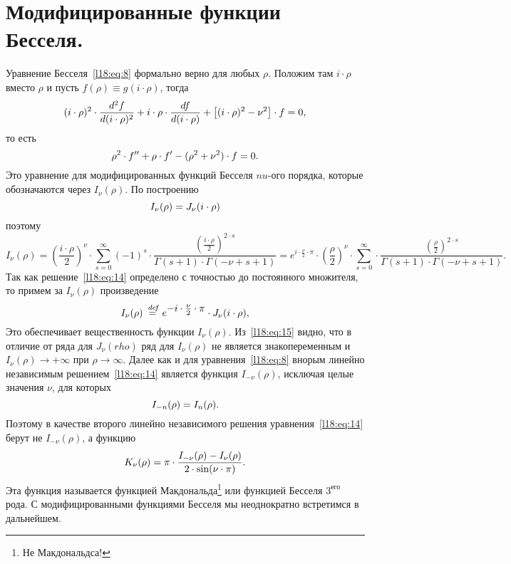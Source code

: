 \section{Модифицированные функции Бесселя.}
\label{lecture18section2}
Уравнение Бесселя~\eqref{l18:eq:8} формально верно для любых $\rho$. Положим там $i\cdot\rho$ вместо $\rho$ и пусть $f(\rho)\equiv g(i\cdot\rho)$, тогда
\begin{equation*}
	\hfill (i\cdot\rho)^2\cdot\dder{f}{(i\cdot\rho)}+i\cdot\rho\cdot\der{f}{(i\cdot\rho)}+\big[(i\cdot\rho)^2-\nu^2\big]\cdot f=0,\hfill
\end{equation*}
то есть
\begin{equation}\label{l18:eq:14}
	\hfill \rho^2\cdot f''+\rho\cdot f'-(\rho^2+\nu^2)\cdot f=0.\hfill
\end{equation}
Это уравнение для модифицированных функций Бесселя $nu$-ого порядка, которые обозначаются через $I_{\nu}(\rho)$. По построению 
\begin{equation*}
	\hfill I_{\nu}(\rho)=J_{\nu}(i\cdot\rho)\hfill
\end{equation*}
поэтому 
\begin{equation}\label{l18:eq:15}
	I_{\nu}(\rho)=\left(\frac{i\cdot \rho}{2}\right)^{\nu}\cdot\sum\limits_{s=0}^{\infty}(-1)^s\cdot\dfrac{\left(\frac{i\cdot\rho}{2}\right)^{2\cdot s}}{\Gamma(s+1)\cdot\Gamma(-\nu+s+1)}=e^{\textstyle i\cdot\frac{\nu}{2}\cdot\pi}\cdot\left(\frac{ \rho}{2}\right)^{\nu}\cdot\sum\limits_{s=0}^{\infty}\cdot\dfrac{\left(\frac{\rho}{2}\right)^{2\cdot s}}{\Gamma(s+1)\cdot\Gamma(-\nu+s+1)}. 
\end{equation}
Так как решение~\eqref{l18:eq:14} определено с точностью до постоянного множителя, то примем за $I_{\nu}(\rho)$ произведение 
\begin{equation*}
	\hfill I_{\nu}(\rho)\eqdef e^{\textstyle- i\cdot\frac{\nu}{2}\cdot\pi}\cdot J_{\nu}(i\cdot\rho),\hfill
\end{equation*}
Это обеспечивает вещественность функции $I_{\nu}(\rho)$. Из~\eqref{l18:eq:15} видно, что в отличие от ряда для $J_{\nu}(rho)$ ряд для $I_{\nu}(\rho)$ не является знакопеременным и $I_{\nu}(\rho)\to+\infty$ при $\rho\to\infty$. Далее как и для уравнения~\eqref{l18:eq:8} внорым линейно независимым решением~\eqref{l18:eq:14} является функция $I_{-\nu}(\rho)$, исключая целые значения $\nu$, для которых 
\begin{equation*}
	\hfill I_{-n}(\rho)=I_{n}(\rho).\hfill
\end{equation*}
Поэтому в качестве второго линейно независимого решения уравнения~\eqref{l18:eq:14} берут не $I_{-\nu}(\rho)$, а функцию 
\begin{equation*}
	\hfill K_{\nu}(\rho)=\pi\cdot\dfrac{I_{-\nu}(\rho)-I_{\nu}(\rho)}{2\cdot\sin(\nu\cdot\pi)}.\hfill
\end{equation*}
Эта функция называется функцией Макдональда\footnote{Не Макдональдса!} или функцией Бесселя $3^{\text{его}}$ рода. С модифицированными функциями Бесселя мы неоднократно встретимся в дальнейшем.
